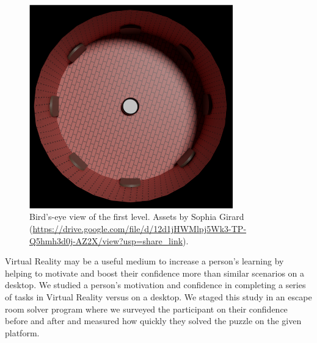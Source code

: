 \documentclass[manuscript,screen,review]{acmart}
\begin{document}
\begin{figure}[h]
  \centering
  \includegraphics[width=250pt]{OverheadView.png}
  \caption{Bird's-eye view of the first level. Assets by Sophia Girard
  (\url{https://drive.google.com/file/d/12d1jHWMlpj5Wk3-TP-Q5hmh3d0j-AZ2X/view?usp=share_link}).}
\end{figure}
\clearpage

Virtual Reality may be a useful medium to increase a person’s learning by helping to motivate and boost their confidence more than similar scenarios on a desktop. We studied a person’s motivation and confidence in completing a series of tasks in Virtual Reality versus on a desktop. We staged this study in an escape room solver program where we surveyed the participant on their confidence before and after and measured how quickly they solved the puzzle on the given platform.




\end{document}
